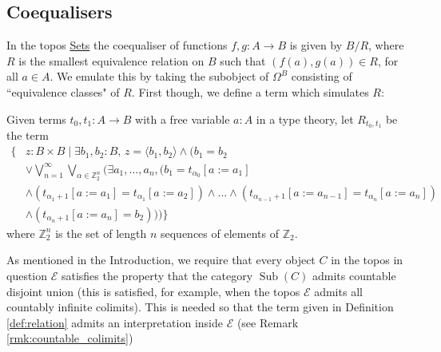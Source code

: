 \documentclass{tac}
\newcommand{\bb}[1]{\mathbb{#1}}
\newcommand{\call}[1]{\mathcal{#1}}
\begin{document}
	\subsection{Coequalisers}
	\label{sec:coequaliser}
	In the topos \underline{Sets} the coequaliser of functions $f,g: A \to B$ is given by $B/R$, where $R$ is the smallest equivalence relation on $B$ such that $(f(a), g(a)) \in R$, for all $a \in A$. We emulate this by taking the subobject of $\Omega^B$ consisting of ``equivalence classes" of $R$. First though, we define a term which simulates $R$:
	\begin{definition}
		\label{def:relation}
		Given terms $t_0,t_1: A \to B$ with a free variable $a:A$ in a type theory, let $R_{t_0,t_1}$ be the term
		\begin{align*}
			\Big\lbrace &z: B \times B \mid \exists b_1, b_2 : B\text{, }z = \langle b_1, b_2 \rangle \wedge \Big(b_1 = b_2\\
			&\vee \bigvee_{n = 1}^\infty\bigvee_{\alpha \in \bb{Z}_2^n}\big( \exists a_1,...,a_n, (b_1 = t_{\alpha_0}[a:= a_1]\\
			&\wedge (t_{\alpha_1 + 1}[a:= a_1] = t_{\alpha_1}[a:= a_2]) \wedge ... \wedge (t_{\alpha_{n-1}+1}[a:= a_{n-1}] = t_{\alpha_{n}}[a:= a_n])\\
			&\wedge (t_{\alpha_{n}+1}[a:= a_n] = b_2)\big)\Big)\Big\rbrace
		\end{align*}
		where $\mathbb{Z}_2^n$ is the set of length $n$ sequences of elements of $\mathbb{Z}_{2}$. 
	\end{definition}
	\begin{remark}
		As mentioned in the Introduction, we require that every object $C$ in the topos in question $\call{E}$ satisfies the property that the category $\operatorname{Sub}(C)$ admits countable disjoint union (this is satisfied, for example, when the topos $\call{E}$ admits all countably infinite colimits). This is needed so that the term given in Definition \ref{def:relation} admits an interpretation inside $\call{E}$ (see Remark \ref{rmk:countable_colimits})
	\end{remark}
	
\end{document}
